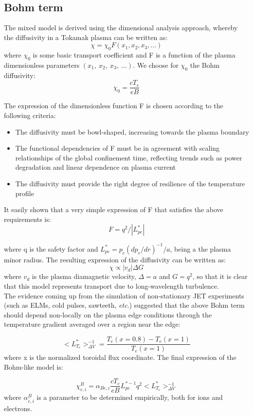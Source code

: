 \documentclass{article}    %
\begin{document}
\subsection{Bohm term}

The mixed model is derived using the dimensional analysis approach,
whereby the diffusivity in a Tokamak plasma can be written as:\hfill
\[ \chi = \chi_0 F(x_1, x_2, x_3, ...)\]
where $\chi_0$ is some basic transport coefficient and F is a function
of the plasma dimensionless parameters $(x_1,\ x_2,\ x_3,\ ...)$. We choose 
for $\chi_0$ the Bohm diffusivity:\hfill
\[ \chi_0 = \frac{cT_e}{eB}\]

The expression of the dimensionless function F is chosen according to
the following criteria:\
\begin{itemize}
\item{The diffusivity must be bowl-shaped, increasing towards the plasma
boundary}
\item{The functional dependencies of F must be in agreement with 
scaling relationships of the global confinement time, reflecting
trends such as power degradation and linear dependence on plasma
current}
\item{The diffusivity must provide the right degree of resilience
of the temperature profile}
\end{itemize}

It easily shown that a very simple expression of F that satisfies
the above requirements is:\hfill
\[ F = q^2/|L_{pe}^*|\]

where q is the safety factor and $L_{pe}^*=p_e(dp_e/dr)^{-1}/a$, being a the
plasma minor radius. The resulting expression of the diffusivity
can be written as:\hfill
\[ \chi \propto |v_d| \Delta G\]
where $v_d$ is the plasma diamagnetic velocity, $\Delta=a$ and $G=q^2$,
so that it is clear that this model represents transport due to 
long-wavelength turbulence.\\
The evidence coming up from the simulation of non-stationary
JET experiments \cite{erb97}(such as ELMs, cold pulses, sawteeth, {\sl etc}.)
suggested that the above Bohm term should depend non-locally
on the plasma edge conditions through the temperature
gradient averaged over a region near the edge:\hfill

\[ <L_{T_e}^*>_{\Delta V}^{-1} = \frac{T_e(x=0.8) - T_e(x=1)}{T_e(x=1)}\]
where x is the normalized toroidal flux coordinate. The final
expression of the Bohm-like model is:\hfill

\[ \chi_{e,i}^B = \alpha_{Be,i} \frac{cT_e}{eB} L_{pe}^{*-1} q^2 <L_{T_e}^*>_{\Delta V}^{-1}\]
where $\alpha_{e,i}^B$ is a parameter to be determined empirically,
both for ions and electrons.\hfill 
\end{document}
